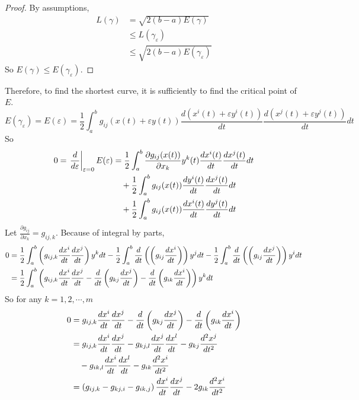 \begin{proof}
	By assumptions,
	\begin{equation*}
		\begin{aligned}
			L(\gamma) & = \sqrt{2(b-a)E(\gamma)} \\
			&\leq L(\gamma_\varepsilon) \\
			&\leq \sqrt{2(b-a)E(\gamma_\varepsilon)}
		\end{aligned}
	\end{equation*}
	So $E(\gamma) \leq E(\gamma_\varepsilon)$.
\end{proof}
Therefore, to find the shortest curve, it is sufficiently to find the critical point of $E$.
\begin{equation*}
	E(\gamma_\varepsilon) = E(\varepsilon) = \frac{1}{2}\int_a^bg_{ij}(x(t) + \varepsilon y(t))\frac{d(x^i(t)+\varepsilon y^i(t))}{dt}\frac{d(x^j(t)+\varepsilon y^j(t))}{dt}dt
\end{equation*}
So
\begin{equation*}
	\begin{aligned}
		0 = \left.\frac{d}{d\varepsilon}\right\lvert_{\varepsilon = 0} E(\varepsilon) &=  \frac{1}{2}\int_a^b \frac{\partial g_{ij}(x(t))}{\partial x_k}y^k(t)\frac{dx^i(t)}{dt}\frac{dx^j(t)}{dt}dt \\
		&\quad + \frac{1}{2}\int_a^b g_{ij}(x(t))\frac{dy^i(t)}{dt}\frac{dx^j(t)}{dt}dt \\
		&\quad + \frac{1}{2}\int_a^b g_{ij}(x(t))\frac{dx^i(t)}{dt}\frac{dy^j(t)}{dt}dt
	\end{aligned}
\end{equation*}
Let $\frac{\partial g_{ij}}{\partial x_k} = g_{ij,k}$. Because of integral by parts,
\begin{equation*}
	\begin{aligned}
		0 &= \frac{1}{2}\int_a^b \left(g_{ij,k}\frac{dx^i}{dt}\frac{dx^j}{dt}\right)y^kdt-\frac{1}{2}\int_a^b \frac{d}{dt}\left(\left(g_{ij}\frac{dx^i}{dt}\right)\right)y^jdt-\frac{1}{2}\int_a^b \frac{d}{dt}\left(\left(g_{ij}\frac{dx^j}{dt}\right)\right)y^idt \\
		&= \frac{1}{2}\int_a^b\left(g_{ij,k}\frac{dx^i}{dt}\frac{dx^j}{dt} - \frac{d}{dt}\left(g_{kj}\frac{dx^j}{dt}\right) -\frac{d}{dt}\left(g_{ik}\frac{dx^i}{dt}\right)\right)y^k dt
	\end{aligned}
\end{equation*}
So for any $k=1,2,\cdots,m$
\begin{equation*}
	\begin{aligned}
		0 &= g_{ij,k}\frac{dx^i}{dt}\frac{dx^j}{dt} - \frac{d}{dt}\left(g_{kj}\frac{dx^j}{dt}\right) -\frac{d}{dt}\left(g_{ik}\frac{dx^i}{dt}\right) \\
		&= g_{ij,k}\frac{dx^i}{dt}\frac{dx^j}{dt} - g_{kj,l}\frac{dx^j}{dt}\frac{dx^l}{dt} - g_{kj}\frac{d^2x^j}{dt^2} \\
		&\quad - g_{ik,l}\frac{dx^i}{dt}\frac{dx^l}{dt} - g_{ik}\frac{d^2x^i}{dt^2} \\
		&=\left(g_{ij,k}-g_{kj,i}-g_{ik,j}\right)\frac{dx^i}{dt}\frac{dx^j}{dt}-2g_{ik}\frac{d^2x^i}{dt^2}
	\end{aligned}
\end{equation*}

